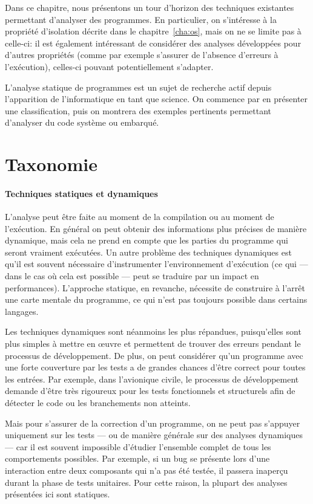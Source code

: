 Dans ce chapitre, nous présentons un tour d'horizon des techniques existantes
permettant d'analyser des programmes. En particulier, on s'intéresse à la
propriété d'isolation décrite dans le chapitre~\ref{cha:os}, mais on ne se
limite pas à celle-ci: il est également intéressant de considérer des analyses
développées pour d'autres propriétés (comme par exemple s'assurer de l'absence
d'erreurs à l'exécution), celles-ci pouvant potentiellement s'adapter.

L'analyse statique de programmes est un sujet de recherche actif depuis
l'apparition de l'informatique en tant que science. On commence par en présenter
une classification, puis on montrera des exemples pertinents permettant
d'analyser du code système ou embarqué.

\section{Taxonomie}

\paragraph{Techniques statiques et dynamiques}

L'analyse peut être faite au moment de la compilation ou au moment de
l'exécution. En général on peut obtenir des informations plus précises de
manière dynamique, mais cela ne prend en compte que les parties du programme qui
seront vraiment exécutées. Un autre problème des techniques dynamiques est qu'il
est souvent nécessaire d'instrumenter l'environnement d'exécution (ce qui ---
dans le cas où cela est possible --- peut se traduire par un impact en
performances). L'approche statique, en revanche, nécessite de construire à
l'arrêt une carte mentale du programme, ce qui n'est pas toujours possible dans
certains langages.

Les techniques dynamiques sont néanmoins les plus répandues, puisqu'elles sont
plus simples à mettre en œuvre et permettent de trouver des erreurs pendant le
processus de développement. De plus, on peut considérer qu'un programme avec une
forte couverture par les tests a de grandes chances d'être correct pour toutes
les entrées. Par exemple, dans l'avionique civile, le processus de développement
demande d'être très rigoureux pour les tests fonctionnels et structurels afin de
détecter le code ou les branchements non atteints.

Mais pour s'assurer de la correction d'un programme, on ne peut pas s'appuyer
uniquement sur les tests --- ou de manière générale sur des analyses dynamiques
--- car il est souvent impossible d'étudier l'ensemble complet de tous les
comportements possibles. Par exemple, si un bug se présente lors d'une
interaction entre deux composants qui n'a pas été testée, il passera inaperçu
durant la phase de tests unitaires. Pour cette raison, la plupart des analyses
présentées ici sont statiques.

